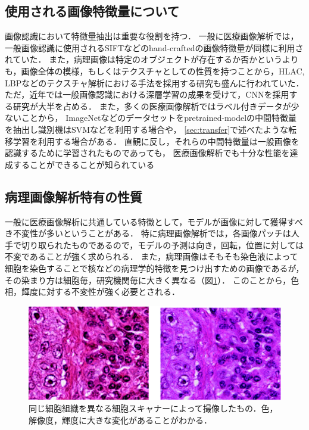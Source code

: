 \subsection{使用される画像特徴量について}
画像認識において特徴量抽出は重要な役割を持つ．
一般に医療画像解析では，一般画像認識に使用されるSIFTなどのhand-craftedの画像特徴量が同様に利用されていた\cite{caicedo2009histopathology}．
また，病理画像は特定のオブジェクトが存在するか否かというよりも，画像全体の模様，もしくはテクスチャとしての性質を持つことから，HLAC, LBPなどのテクスチャ解析における手法を採用する研究も盛んに行われていた\cite{sertel2008texture, sertel2009histopathological, nosato2011extended}．
ただ，近年では一般画像認識における深層学習の成果を受けて，CNNを採用する研究が大半を占める．
また，多くの医療画像解析ではラベル付きデータが少ないことから，
ImageNetなどのデータセットをpretrained-modelの中間特徴量を抽出し識別機はSVMなどを利用する場合や，
\ref{sec:transfer}で述べたような転移学習を利用する場合がある．
直観に反し，それらの中間特徴量は一般画像を認識するために学習されたものであっても，
医療画像解析でも十分な性能を達成することができることが知られている\cite{li2014medical, tajbakhsh2016convolutional}

\subsection{病理画像解析特有の性質}
一般に医療画像解析に共通している特徴として，モデルが画像に対して獲得すべき不変性が多いということがある．
特に病理画像解析では，各画像パッチは人手で切り取られたものであるので，モデルの予測は向き，回転，位置に対しては不変であることが強く求められる．
また，病理画像はそもそも染色液によって細胞を染色することで核などの病理学的特徴を見つけ出すための画像であるが，
その染まり方は細胞毎，研究機関毎に大きく異なる（図\ref{fig:comparison_color}）．
このことから，色相，輝度に対する不変性が強く必要とされる．

\begin{figure}[tbp]
     \begin{center}
      \includegraphics[width=13cm]{figures/comparison_color.pdf}
     \end{center}
    \caption{\label{fig:comparison_color}同じ細胞組織を異なる細胞スキャナーによって撮像したもの．色，解像度，輝度に大きな変化があることがわかる．}
\end{figure}

